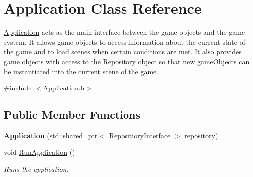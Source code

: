 \hypertarget{class_application}{}\section{Application Class Reference}
\label{class_application}


\hyperlink{class_application}{Application} acts as the main interface between the game objects and the game system. It allows game objects to access information about the current state of the game and to load scenes when certain conditions are met. It also provides game objects with access to the \hyperlink{class_repository}{Repository} object so that new game\+Objects can be instantiated into the current scene of the game.  




{\ttfamily \#include $<$Application.\+h$>$}

\subsection*{Public Member Functions}
\begin{DoxyCompactItemize}
\item 
\mbox{\label{class_application_a642282f8aa7f2d10b35cf828792038ee}} 
{\bfseries Application} (std\+::shared\+\_\+ptr$<$ \hyperlink{class_repositiory_interface}{Repositiory\+Interface} $>$ repository)
\item 
\mbox{\label{class_application_a12f09b1508e9a881c97786cd07dab53a}} 
void \hyperlink{class_application_a12f09b1508e9a881c97786cd07dab53a}{Run\+Application} ()
\begin{DoxyCompactList}\small\item\em Runs the application. \end{DoxyCompactList}\end{DoxyCompactItemize}
